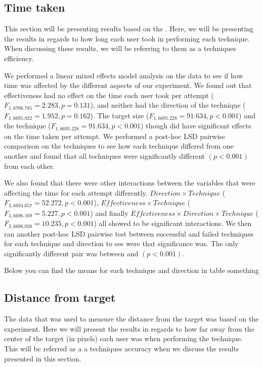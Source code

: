 \subsection{Time taken}
This section will be presenting results based on the \target.
Here, we will be presenting the results in regards to how long each user took in performing each technique. 
When discussing these results, we will be referring to them as a techniques efficiency.

We performed a linear mixed effects model analysis on the data to see if how time was affected by the different aspects of our experiment. 
We found out that effectiveness had no effect on the time each user took per attempt ($F_{1,6706.785} = 2.283, p = 0.131$), and neither had the direction of the technique ($F_{1,6695.822} = 1.952, p = 0.162$). 
The target size ($F_{1,6695.228} = 91.634, p < 0.001$) and the technique  ($F_{1,6695.228} = 91.634, p < 0.001$) though did have significant effects on the time taken per attempt. 
We performed a post-hoc LSD pairwise comparison on the techniques to see how each technique differed from one another and found that all techniques were significantly different $(p<0.001)$ from each other. 

We also found that there were other interactions between the variables that were affecting the time for each attempt differently. 
$Direction \times Technique$  ($F_{3,6694.657} = 52.272, p < 0.001$), $Effectiveness \times Technique$  ($F_{3,6696.169} = 5.227, p < 0.001$) and finally $Effectiveness \times Direction \times Technique$  ($F_{3,6696.038} = 10.235, p < 0.001$) all showed to be significant interactions. 
We then ran another post-hoc LSD pairwise test between successful and failed techniques for each technique and direction to see were that significance was. 
The only significantly different pair was between \grab \push and \pull $(p < 0.001)$.

Below you can find the means for each technique and direction in table something

\subsection{Distance from target}
The data that was used to measure the distance from the target was based on the \accuracy experiment.
Here we will present the results in regards to how far away from the center of the target (in pixels) each user was when performing the technique. 
This will be referred as a a techniques accuracy when we discuss the results presented in this section. 


